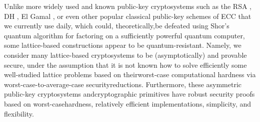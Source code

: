 \documentclass[runningheads]{llncs}
\numberwithin{equation}{section}
\begin{document}
    Unlike more widely used and known public-key cryptosystems such as the RSA \cite{rivest-shamir-adleman:method-digital-signatures-and-public-key-cryptosystems:1978:06-2024}, DH \cite{diffie-hellman:new-directions-cryptography:1976:06-2024,merkle:secure-communications-over-insecure-channels:1978:06-2024}, El Gamal \cite{elgamal:public-key-cryptosystem-signature-scheme-based-discrete-logarithms:1985:06-2024}, or even other popular classical public-key schemes of ECC \cite{miller:use-elliptic-curves-cryptography:1986:06-2024,koblitz:elliptic-curve-cryptosystems:1987:06-2024} that we currently use daily, which could, theoretically,\break be defeated using Shor's \cite{shor:algorithms-quantum-computation-discrete-logarithms-and-factoring:1994:06-2024,shor:polynomial-time-algorithms-prime-factorization-and-discrete-logarithms-quantum-computer:1997:06-2024} quantum algorithm for factoring on a sufficiently powerful quantum computer, some lattice-based constructions appear to be quantum-resistant. Namely, we consider many lattice-based cryptosystems to be (asymptotically) and provable secure, under the assumption that it is not known how to solve efficiently some well-studied lattice problems based on their\break worst-case computational hardness via worst-case-to-average-case security\break reductions. Furthermore, these asymmetric public-key cryptosystems and\break cryptographic primitives have robust security proofs based on worst-case\break hardness, relatively efficient implementations, simplicity, and flexibility.
    
\end{document}
